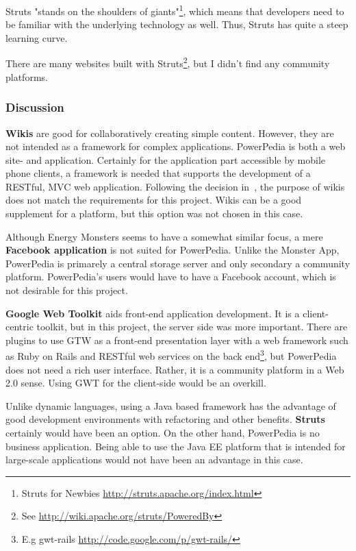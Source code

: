 Struts "stands on the shoulders of giants"\footnote{Struts for Newbies \url{http://struts.apache.org/index.html}}, which means that developers need to be familiar with the underlying technology as well. Thus, Struts has quite a steep learning curve. 

There are many websites built with Struts\footnote{See \url{http://wiki.apache.org/struts/PoweredBy}}, but I didn't find any community platforms. 

\subsubsection{Discussion}
\textbf{Wikis} are good for collaboratively creating simple content. However, they are not intended as a framework for complex applications. PowerPedia is both a web site- and application. Certainly for the application part accessible by mobile phone clients, a framework is needed that supports the development of a RESTful, MVC web application. Following the decision in~\cite{merklepp}, the purpose of wikis does not match the requirements for this project. 
Wikis can be a good supplement for a platform, but this option was not chosen in this case.

Although Energy Monsters seems to have a somewhat similar focus, a mere \textbf{Facebook application} is not suited for PowerPedia. Unlike the Monster App, PowerPedia is primarely a central storage server and only secondary a community platform. PowerPedia's users would have to have a Facebook account, which is not desirable for this project. 

\textbf{Google Web Toolkit} aids front-end application development. It is a client-centric toolkit, but in this project, the server side was more important. 
There are plugins to use GTW as a front-end presentation layer with a web framework such as Ruby on Rails and RESTful web services on the back end\footnote{E.g gwt-rails \url{http://code.google.com/p/gwt-rails/}}, but PowerPedia does not need a rich user interface. Rather, it is a community platform in a Web 2.0 sense. Using GWT for the client-side would be an overkill. 

Unlike dynamic languages, using a Java based framework has the advantage of good development environments with refactoring and other benefits. \textbf{Struts} certainly would have been an option. On the other hand, PowerPedia is no business application. Being able to use the Java EE platform that is intended for large-scale applications would not have been an advantage in this case.  

